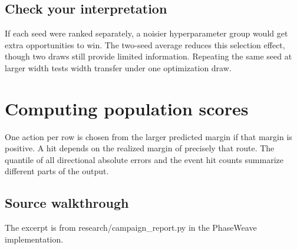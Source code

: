 \documentclass[11pt,oneside,openany]{book}
\begin{document}
\section*{Check your interpretation}
If each seed were ranked separately, a noisier hyperparameter group would get extra opportunities to win. The two-seed average reduces this selection effect, though two draws still provide limited information. Repeating the same seed at larger width tests width transfer under one optimization draw.

\chapter{Computing population scores}
One action per row is chosen from the larger predicted margin if that margin is positive. A hit depends on the realized margin of precisely that route. The quantile of all directional absolute errors and the event hit counts summarize different parts of the output.

\section*{Source walkthrough}
The excerpt is from research/campaign\_report.py in the PhaseWeave implementation.
\end{document}
